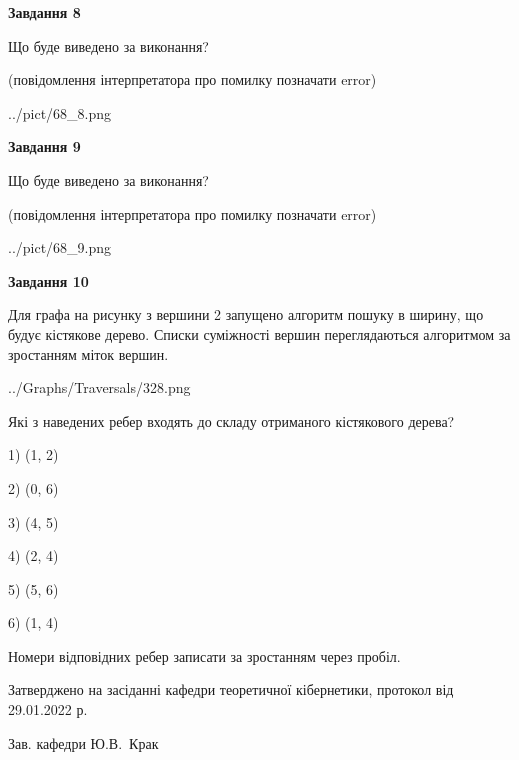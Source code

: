 \documentclass[12pt, ukrainian]{article}
\begin{document}
{\begin {large}
{\begin {center}\textbf{Завдання 8}\end {center}}\par
Що буде виведено за виконання?\par
 (повідомлення інтерпретатора про помилку позначати error)\par
\begin{center}
	{../pict/68_8.png}
\end{center}
\newpage

{\begin {center}\textbf{Завдання 9}\end {center}}\par
Що буде виведено за виконання?\par
 (повідомлення інтерпретатора про помилку позначати error)\par
\begin{center}
	{../pict/68_9.png}
\end{center}
\newpage

{\begin {center}\textbf{Завдання 10}\end {center}}\par
Для графа на рисунку з вершини 2 запущено алгоритм пошуку в ширину, що будує кістякове дерево. Списки суміжності вершин переглядаються алгоритмом за зростанням міток вершин.\par
\begin{center}
	{../Graphs/Traversals/328.png}
\end{center}
\par Які з наведених ребер входять до складу отриманого кістякового дерева?\par
1) (1, 2)\par
2) (0, 6)\par
3) (4, 5)\par
4) (2, 4)\par
5) (5, 6)\par
6) (1, 4)\par
{\vskip 15pt} Номери відповідних ребер записати за зростанням через пробіл.\par
\newpage


\end {large}
}
{\smallskip \begin {small} Затверджено на засіданні кафедри теоретичної кібернетики, протокол  від   29.01.2022 р.\par\smallskip\smallskip
{\parbox {6.5 cm}{Зав. кафедри \dotfill Ю.В.~Крак}} \end{small}}
\end{document}
